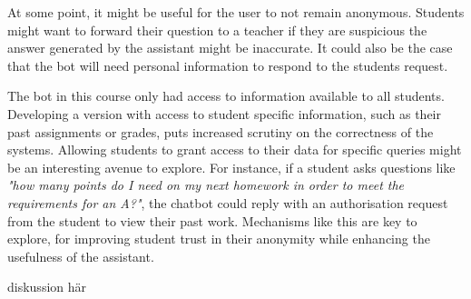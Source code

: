 At some point, it might be useful for the user to not remain anonymous. Students might want to forward their question to a teacher if they are suspicious the answer generated by the assistant might be inaccurate. It could also be the case that the bot will need personal information to respond to the students request.


The bot in this course only had access to information available to all students. Developing a version with access to student specific information, such as their past assignments or grades, puts increased scrutiny on the correctness of the systems. Allowing students to grant access to their data for specific queries might be an interesting avenue to explore. For instance, if a student asks questions like \textit{"how many points do I need on my next homework in order to meet the requirements for an A?"}, the chatbot could reply with an authorisation request from the student to view their past work. Mechanisms like this are key to explore, for improving student trust in their anonymity while enhancing the usefulness of the assistant.






%






diskussion här


\cleardoublepage